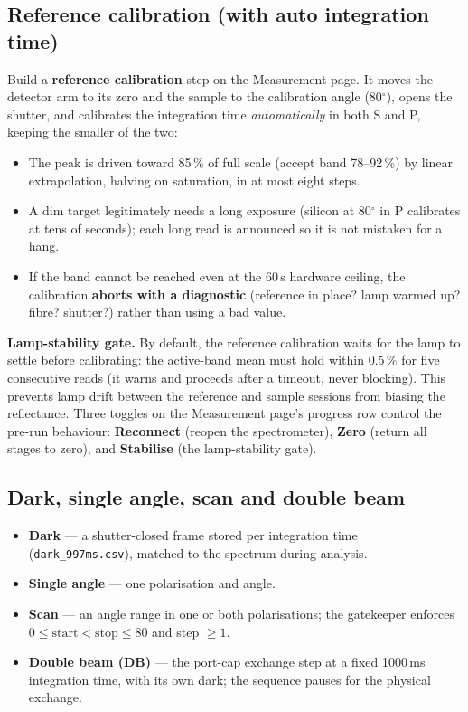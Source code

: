 \documentclass[11pt]{article}
\newcommand{\code}[1]{\texttt{\small #1}}
\begin{document}
\subsection{Reference calibration (with auto integration time)}
Build a \textbf{reference calibration} step on the Measurement page. It moves the detector arm to its
zero and the sample to the calibration angle (80$^\circ$), opens the shutter, and calibrates the
integration time \emph{automatically} in both S and P, keeping the smaller of the two:
\begin{itemize}
\item The peak is driven toward 85\,\% of full scale (accept band 78--92\,\%) by linear
extrapolation, halving on saturation, in at most eight steps.
\item A dim target legitimately needs a long exposure (silicon at 80$^\circ$ in P calibrates at tens
of seconds); each long read is announced so it is not mistaken for a hang.
\item If the band cannot be reached even at the 60\,s hardware ceiling, the calibration \textbf{aborts
with a diagnostic} (reference in place? lamp warmed up? fibre? shutter?) rather than using a bad value.
\end{itemize}

\begin{notebox}
\small\textbf{Lamp-stability gate.} By default, the reference calibration waits for the lamp to settle
before calibrating: the active-band mean must hold within 0.5\,\% for five consecutive reads (it warns
and proceeds after a timeout, never blocking). This prevents lamp drift between the reference and
sample sessions from biasing the reflectance. Three toggles on the Measurement page's progress row
control the pre-run behaviour: \textbf{Reconnect} (reopen the spectrometer), \textbf{Zero} (return all
stages to zero), and \textbf{Stabilise} (the lamp-stability gate).
\end{notebox}

\subsection{Dark, single angle, scan and double beam}
\begin{itemize}
\item \textbf{Dark} --- a shutter-closed frame stored per integration time (\code{dark\_997ms.csv}),
matched to the spectrum during analysis.
\item \textbf{Single angle} --- one polarisation and angle.
\item \textbf{Scan} --- an angle range in one or both polarisations; the gatekeeper enforces
$0 \le \text{start} < \text{stop} \le 80$ and step $\ge 1$.
\item \textbf{Double beam (DB)} --- the port-cap exchange step at a fixed 1000\,ms integration time,
with its own dark; the sequence pauses for the physical exchange.
\end{itemize}
\end{document}

